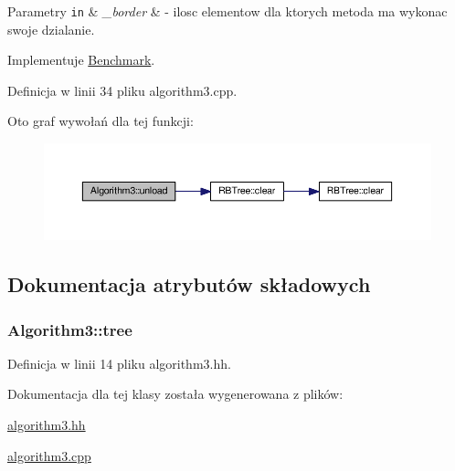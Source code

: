 \begin{DoxyParams}[1]{Parametry}
\mbox{\tt in}  & {\em \-\_\-border} & -\/ ilosc elementow dla ktorych metoda ma wykonac swoje dzialanie. \\
\hline
\end{DoxyParams}


Implementuje \hyperlink{class_benchmark_a2dcfb6ee9e648ae88d8c131b2b191bed}{Benchmark}.



Definicja w linii 34 pliku algorithm3.\-cpp.



Oto graf wywołań dla tej funkcji\-:
\nopagebreak
\begin{figure}[H]
\begin{center}
\leavevmode
\includegraphics[width=350pt]{class_algorithm3_a170d77ee28866741214e65da7efcf533_cgraph}
\end{center}
\end{figure}




\subsection{Dokumentacja atrybutów składowych}
\hypertarget{class_algorithm3_a258233c4774afd7d6e6d5a1198955556}{
\subsubsection[{tree}]{ Algorithm3\-::tree\hspace{0.3cm}{\ttfamily [private]}}}\label{class_algorithm3_a258233c4774afd7d6e6d5a1198955556}


Definicja w linii 14 pliku algorithm3.\-hh.



Dokumentacja dla tej klasy została wygenerowana z plików\-:\begin{DoxyCompactItemize}
\item 
\hyperlink{algorithm3_8hh}{algorithm3.\-hh}\item 
\hyperlink{algorithm3_8cpp}{algorithm3.\-cpp}\end{DoxyCompactItemize}

